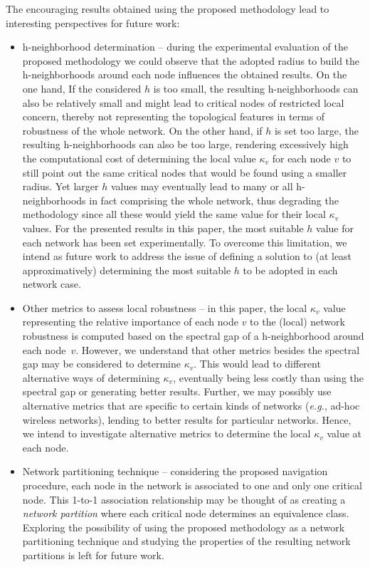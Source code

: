 \documentclass[conference,fleqn]{IEEEtran}
\begin{document}
The encouraging results obtained using the proposed methodology lead to interesting
perspectives for future work:

\begin{itemize}

\item h-neighborhood determination -- during the experimental evaluation of the proposed methodology we could observe that the adopted 
radius to build the h-neighborhoods around each node influences the obtained results. 
On the one hand, If the considered $h$ is too small, the resulting h-neighborhoods can also be relatively small
and might lead to critical nodes of restricted local concern, thereby not representing the topological features
in terms of robustness of the whole network. On the other hand, if $h$ is set too large, the resulting h-neighborhoods 
can also be too large, rendering excessively high the computational cost of determining the local value $\kappa_v$ for each node 
$v$ to still point out the same critical nodes that would be found using a smaller radius. Yet larger $h$ values may
eventually lead to many or all h-neighborhoods in fact comprising the whole network, thus degrading the methodology
since all these would yield the same value for their local $\kappa_v$ values.
For the presented results in this paper, the most suitable $h$ value for each network has been set experimentally. 
To overcome this limitation, we intend as future work to address the issue of defining a solution to (at least approximatively) 
determining the most suitable $h$ to be adopted in each network case. 

\item Other metrics to assess local robustness -- in this paper, the local $\kappa_v$ value representing the relative importance of 
each node $v$ to the (local) network robustness is computed based on the spectral gap of a h-neighborhood around each
node~$v$. However, we understand that other metrics besides the spectral gap may be considered to 
determine $\kappa_v$. This would lead to different alternative ways of determining $\kappa_v$, 
eventually being less costly than using the spectral gap or generating better results.
Further, we may possibly use alternative metrics that are specific to certain kinds of networks (\textit{e.g.}, ad-hoc 
wireless networks), lending to better results for particular networks. Hence, we intend to investigate
alternative metrics to determine the local $\kappa_v$ value at each node.

\item Network partitioning technique -- considering the proposed navigation procedure, each node in the network is
associated to one and only one critical node. This 1-to-1 association relationship 
may be thought of as creating a \emph{network partition} where each critical node determines an equivalence class.
Exploring the possibility of using the proposed methodology as a network partitioning technique and studying the
properties of the resulting network partitions is left for future work.

\end{itemize} 
\end{document}
